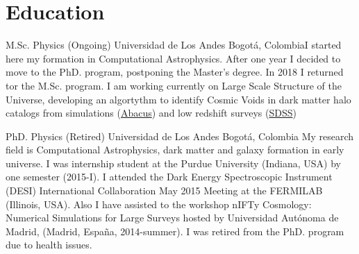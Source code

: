 \documentclass[12pt,letterpaper,sans]{moderncv}
\begin{document}



\section{Education}


{M.Sc. Physics (Ongoing)}
{Universidad de Los Andes}
{Bogot\'a, Colombia}{}{I started here my formation in Computational Astrophysics. After
  one year I decided to move to the PhD. program, postponing the Master's degree.
  In 2018 I returned tor the M.Sc. program. I am working currently on Large Scale
  Structure of the Universe, developing an algortythm to identify Cosmic Voids in
  dark matter halo catalogs from simulations
  (\href{https://lgarrison.github.io/AbacusCosmos/}{Abacus}) and low redshift
  surveys (\href{https://classic.sdss.org/dr7/}{SDSS})}

{PhD. Physics (Retired)}
{Universidad de Los Andes}
{Bogot\'a, Colombia}{}{
My research field is Computational Astrophysics, dark matter and galaxy formation in 
early universe. I was internship student at the Purdue University (Indiana, USA) by one 
semester (2015-I).
I attended the Dark Energy Spectroscopic Instrument (DESI) International Collaboration May 
2015 Meeting at the FERMILAB (Illinois, USA). 
Also I have assisted to the workshop nIFTy Cosmology: Numerical Simulations for Large 
Surveys hosted by Universidad Aut\'onoma de Madrid, (Madrid, Espa\~na, 2014-summer). 
I was retired from the PhD. program due to health issues.}


\bigskip
\end{document}
